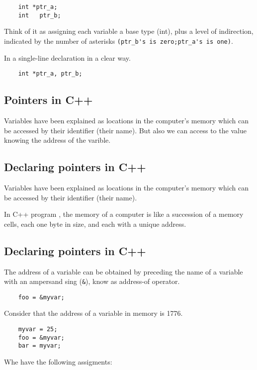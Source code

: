 \documentclass[12pt]{article}
\begin{document}
	\begin{verbatim}
	int *ptr_a;
	int   ptr_b;
	\end{verbatim}
	Think of it as assigning each variable a base type (int), plus a level of indirection, indicated by the number of asterisks \verb|(ptr_b's is zero;ptr_a's is one)|.

	In a single-line declaration in a clear way.

	\begin{verbatim}
	int *ptr_a, ptr_b;
	\end{verbatim}

	\subsection{Pointers in C++}

	Variables have been explained as locations in the computer's memory which can be accessed by their identifier (their name). But also we can access to the value knowing the address of the varible. 


	\subsection{Declaring pointers in C++}


	Variables have been explained as locations in the computer's memory which can be accessed by their identifier (their name).

	In C++ program , the memory of a computer is like a succession of a memory cells, each one byte in size, and each with a unique address. 

	\subsection{Declaring pointers in C++}
	The address of a variable can be obtained by preceding the name of a variable with an ampersand sing (\verb|&|), know as address-of operator. 

	\begin{verbatim}
	foo = &myvar; 
	\end{verbatim}

	Consider that the address of a variable in memory is 1776. 

	\begin{verbatim}
	myvar = 25;
	foo = &myvar;
	bar = myvar;
	\end{verbatim}

	Whe have the following assigments: 
\end{document}
